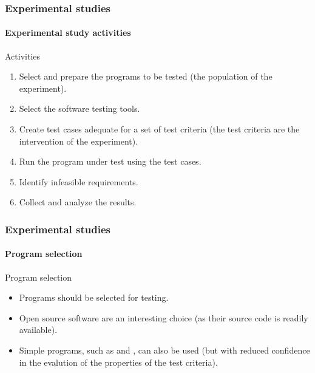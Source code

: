 \begin{frame}[parent={cmap:experimental-studies},hasnext=true,hasprev=true]
\frametitle{Experimental studies}
\framesubtitle{Experimental study activities}

\begin{block:procedure}{Activities}
\begin{enumerate}
	\item Select and prepare the programs to be tested (the population of the
	experiment).

	\item Select the software testing tools.

	\item Create test cases adequate for a set of test criteria (the test
	criteria are the intervention of the experiment).

	\item Run the program under test using the test cases.

	\item Identify infeasible requirements.

	\item Collect and analyze the results.
\end{enumerate}
\end{block:procedure}
\end{frame}


\begin{frame}
\frametitle{Experimental studies}
\framesubtitle{Program selection}

\begin{block:fact}{Program selection}
\begin{itemize}
	\item Programs should be selected for testing.

	\item Open source software are an interesting choice (as their source
	code is readily available).

	\item Simple programs, such as  and ,
	can also be used (but with reduced confidence in the evalution of the
	properties of the test criteria).
\end{itemize}
\end{block:fact}
\end{frame}



